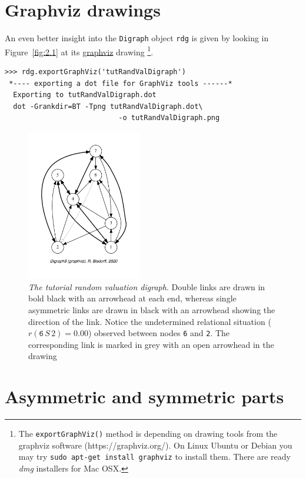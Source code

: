 \section{Graphviz drawings}
\label{sec:2.2}

An even better insight into the \texttt{Digraph} object \texttt{rdg} is given by looking in Figure~\vref{fig:2.1} at its \href{https://graphviz.org/}{graphviz} drawing \citep{graphviz}\footnote{The \texttt{exportGraphViz()} method is depending on drawing tools from the graphviz software (https://graphviz.org/). On Linux Ubuntu or Debian you may try \texttt{sudo apt-get install graphviz} to install them. There are ready \emph{dmg} installers for Mac OSX.}.
\begin{lstlisting}
>>> rdg.exportGraphViz('tutRandValDigraph')
 *---- exporting a dot file for GraphViz tools ------*
  Exporting to tutRandValDigraph.dot
  dot -Grankdir=BT -Tpng tutRandValDigraph.dot\
                           -o tutRandValDigraph.png
\end{lstlisting}
\begin{figure}[ht]
\sidecaption[t]
\includegraphics[width=5cm]{Figures/2-1-tutRandValDigraph.pdf}
\caption[The tutorial random valuation digraph]{\emph{The tutorial random valuation digraph}. Double links are drawn in bold black with an arrowhead at each end, whereas single asymmetric links are drawn in black with an arrowhead showing the direction of the link. Notice the undetermined relational situation ($r(\mathtt{6}\,S\,\mathtt{}2) = 0.00$) observed between nodes \texttt{6} and \texttt{2}. The corresponding link is marked in grey with an open arrowhead in the drawing}
\label{fig:2.1}       %
\end{figure}
  
\section{Asymmetric and symmetric parts}
\label{sec:2.3}

